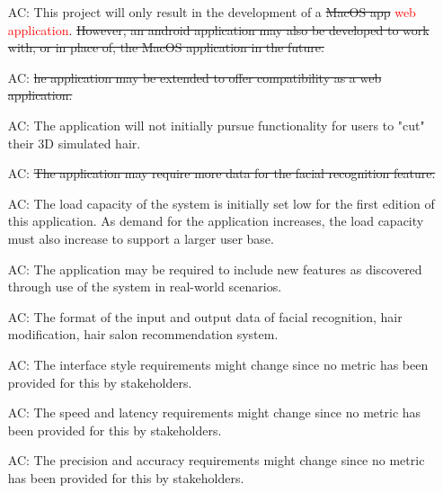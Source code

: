 \documentclass[12pt, titlepage]{article}
\newcounter{acnum}
\begin{document}
\noindent \begin{itemize}

\item[AC\refstepcounter{acnum}\theacnum\label{LC_meaningfulLabel}:] 
This project will only result in the development of a \sout{MacOS app} \textcolor{red}{web application}. \sout{However, an android application may also be developed to work with, or in place of, the MacOS application in the future.}
\item[AC\refstepcounter{acnum}\theacnum\label{LC_meaningfulLabel}:] 
\sout{he application may be extended to offer compatibility as a web application.}
\item[AC\refstepcounter{acnum}\theacnum\label{LC_meaningfulLabel}:] 
The application will not initially pursue functionality for users to "cut" their 3D simulated hair.
\item[AC\refstepcounter{acnum}\theacnum\label{LC_meaningfulLabel}:] 
\sout{The application may require more data for the facial recognition feature.}
\item[AC\refstepcounter{acnum}\theacnum\label{LC_meaningfulLabel}:] 
The load capacity of the system is initially set low for the first edition of this application. As demand for the application increases, the load capacity must also increase to support a larger user base.
\item[AC\refstepcounter{acnum}\theacnum\label{LC_meaningfulLabel}:] 
The application may be required to include new features as discovered through use of the system in real-world scenarios.
\item[AC\refstepcounter{acnum}\theacnum\label{LC_meaningfulLabel}:] 
The format of the
input and output data of facial recognition, hair modification, hair salon recommendation system.
\item[AC\refstepcounter{acnum}\theacnum\label{LC_meaningfulLabel}:] 
The interface style requirements might change since no metric has been provided for this by stakeholders. 
\item[AC\refstepcounter{acnum}\theacnum\label{LC_meaningfulLabel}:] 
The speed and latency requirements might change since no metric has been provided for this by stakeholders. 
\item[AC\refstepcounter{acnum}\theacnum\label{LC_meaningfulLabel}:] 
The precision and accuracy requirements might change since no metric has been provided for this by stakeholders. 


\end{itemize}
\end{document}
